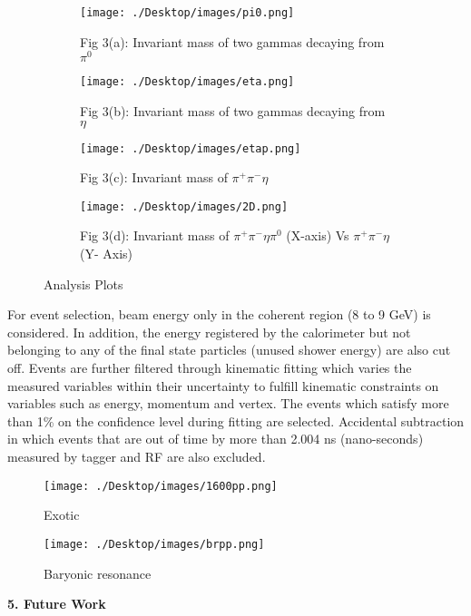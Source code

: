 \documentclass[11pt]{article}
\begin{document}
\begin{figure}
\centering
\begin{subfigure}{.6\textwidth}
  \centering
  \texttt{[image: ./Desktop/images/pi0.png]}
  \caption{Fig 3(a): Invariant mass of two gammas decaying from $\pi^{0}$}
  \label{fig:sub1}
\end{subfigure}%
\begin{subfigure}{.6\textwidth}
  \centering
  \texttt{[image: ./Desktop/images/eta.png]}
  \caption{Fig 3(b): Invariant mass of two gammas decaying from $\eta$  }                                             
 \label{fig:sub2}
\end{subfigure}
\begin{subfigure}{.6\textwidth}
  \centering
  \texttt{[image: ./Desktop/images/etap.png]}
  \caption{Fig 3(c): Invariant mass of $\pi^{+}\pi^{-}\eta$  }
  \label{fig:sub3}
\end{subfigure}%
\begin{subfigure}{.6\textwidth}
  \centering
  \texttt{[image: ./Desktop/images/2D.png]}
  \caption{Fig 3(d): Invariant mass of $\pi^{+}\pi^{-}\eta\pi^{0}$ (X-axis)  Vs $ \pi^{+} \pi^{-}\eta$ (Y- Axis)}
  \label{fig:sub3}
\end{subfigure}
\caption{Analysis Plots}
\label{fig:test}
\end{figure}
For event selection, beam energy only in the coherent region (8 to 9 GeV) is considered. In addition, the energy registered by the calorimeter but not belonging to any of the final state particles (unused shower energy) are also cut off. Events are further filtered through kinematic fitting which varies the measured variables within their uncertainty to fulfill kinematic constraints on variables such as energy, momentum and vertex.  The events which satisfy more than 1\% on the confidence level during fitting are selected. Accidental subtraction in which events that are out of time by more than 2.004 ns (nano-seconds) measured by tagger and RF are also excluded.\\


\begin{figure}[!tbp]
  \centering
  \begin{minipage}[b]{0.4\textwidth}
    \texttt{[image: ./Desktop/images/1600pp.png]}
    \caption{Exotic}
  \end{minipage}
  \hfill
  \begin{minipage}[b]{0.4\textwidth}
    \texttt{[image: ./Desktop/images/brpp.png]}
    \caption{Baryonic resonance}
  \end{minipage}
\end{figure}
\textbf{5.	Future Work}\\
\end{document}
